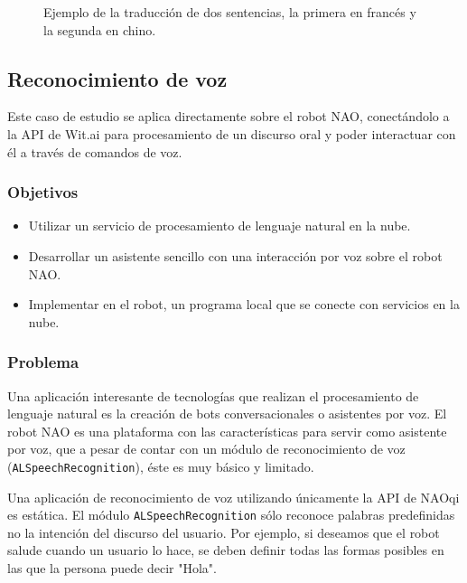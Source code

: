 \begin{figure}[htbp]
    \centering
    \qquad
    \caption{Ejemplo de la traducción
    de dos sentencias, la primera en francés y la segunda
    en chino.}
\end{figure}

\subsection{Reconocimiento de voz}

Este caso de estudio se aplica
directamente sobre el robot NAO, conectándolo
a la API de Wit.ai para procesamiento de
un discurso oral y poder interactuar con él a través de comandos de voz.


\subsubsection{Objetivos}

\begin{itemize}

    \item Utilizar un servicio de procesamiento
    de lenguaje natural en la nube.
    \item Desarrollar un asistente sencillo con una interacción por voz sobre el robot NAO.
    \item Implementar en el robot, un programa local
    que se conecte con servicios en la nube.
    
\end{itemize}

\subsubsection{Problema}


Una aplicación interesante de tecnologías que realizan el
procesamiento de lenguaje natural es la creación de bots conversacionales
o asistentes por voz.
El robot NAO es una plataforma con las características
para servir como asistente por voz, que a pesar de contar con un
módulo de reconocimiento de voz (\texttt{ALSpeechRecognition}), éste es muy 
básico y limitado.

Una aplicación de reconocimiento de voz
utilizando únicamente la API de NAOqi es estática.
El módulo \texttt{ALSpeechRecognition} sólo reconoce
palabras predefinidas no la intención
del discurso del usuario.
Por ejemplo, si deseamos que el robot salude
cuando un usuario lo hace, se deben 
definir todas las formas posibles en las que
la persona puede decir "Hola".

